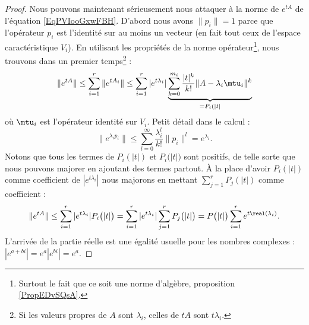 \begin{proof}
    Nous pouvons maintenant sérieusement nous attaquer à la norme de \(  e^{tA}\) de l'équation \eqref{EqPVIooGxwFBH}. D'abord nous avons \( \| p_i \|=1\) parce que l'opérateur \( p_i\) est l'identité sur au moins un vecteur (en fait tout ceux de l'espace caractéristique \( V_i\)). En utilisant les propriétés de la norme opérateur\footnote{Surtout le fait que ce soit une norme d'algèbre, proposition \ref{PropEDvSQsA}.}, nous trouvons dans un premier temps\footnote{Si les valeurs propres de \( A\) sont \( \lambda_i\), celles de \( tA\) sont \( t\lambda_i\).} :
    \begin{equation}
        \|  e^{tA} \|\leq \sum_{i=1}^r\|  e^{tA_i} \|\leq \sum_{i=1}^r|  e^{t\lambda_i} |\underbrace{\sum_{k=0}^{m_i}\frac{ | t |^k }{ k! }\| A-\lambda_i\mtu_i \|^k}_{=P_i( | t | }
    \end{equation}
    où \( \mtu_i\) est l'opérateur identité sur \( V_i\). Petit détail dans le calcul :
    \begin{equation}
        \|  e^{\lambda_ip_i} \|\leq \sum_{l=0}^{\infty}\frac{ \lambda_i^l }{ k! }\| p_i \|^l= e^{\lambda_i}.
    \end{equation}
    Notons que tous les termes de \( P_i(| t |)\) et \( P_i\big( | t | \big)\) sont positifs, de telle sorte que nous pouvons majorer en ajoutant des termes partout. À la place d'avoir \( P_i(| t |)\) comme coefficient de \( |  e^{t\lambda_i} |\) nous majorons en mettant \( \sum_{j=1}^rP_j(| t |)\) comme coefficient :
    \begin{equation}
        \|  e^{tA} \|\leq    \sum_{i=1}^r|  e^{t\lambda_i} |P_i\big( | t | \big)
        =\sum_{i=1}^r|  e^{t\lambda_i} |\sum_{j=1}^rP_j\big( | t | \big)=P\big( | t | \big)\sum_{i=1}^r e^{t\real(\lambda_i)}.
    \end{equation}
    L'arrivée de la partie réelle est une égalité usuelle pour les nombres complexes : $|  e^{a+bi} |= e^{a}|  e^{bi} |= e^{a}$.
\end{proof}

